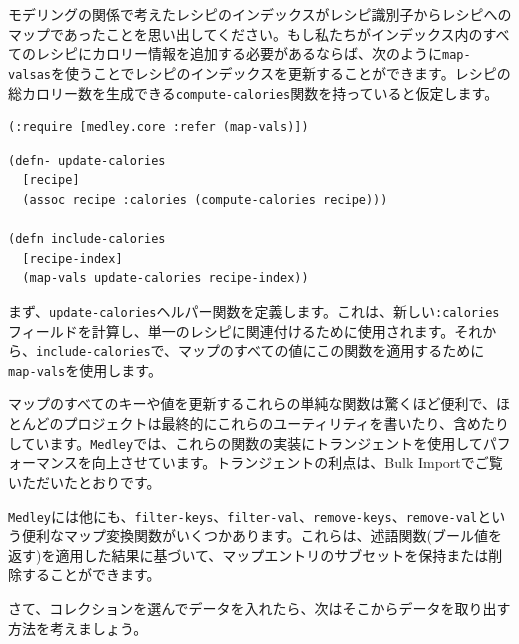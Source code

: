 モデリングの関係で考えたレシピのインデックスがレシピ識別子からレシピへのマップであったことを思い出してください。もし私たちがインデックス内のすべてのレシピにカロリー情報を追加する必要があるならば、次のように\texttt{map-valsas}を使うことでレシピのインデックスを更新することができます。レシピの総カロリー数を生成できる\texttt{compute-calories}関数を持っていると仮定します。

\begin{lstlisting}[numbers=none]
(:require [medley.core :refer (map-vals)])
\end{lstlisting}


\begin{lstlisting}[numbers=none]
(defn- update-calories
  [recipe]
  (assoc recipe :calories (compute-calories recipe)))

(defn include-calories
  [recipe-index]
  (map-vals update-calories recipe-index))
\end{lstlisting}

まず、\texttt{update-calories}ヘルパー関数を定義します。これは、新しい\texttt{:calories}フィールドを計算し、単一のレシピに関連付けるために使用されます。それから、\texttt{include-calories}で、マップのすべての値にこの関数を適用するために\texttt{map-vals}を使用します。
   
マップのすべてのキーや値を更新するこれらの単純な関数は驚くほど便利で、ほとんどのプロジェクトは最終的にこれらのユーティリティを書いたり、含めたりしています。\texttt{Medley}では、これらの関数の実装にトランジェントを使用してパフォーマンスを向上させています。トランジェントの利点は、Bulk Importでご覧いただいたとおりです。

\texttt{Medley}には他にも、\texttt{filter-keys}、\texttt{filter-val}、\texttt{remove-keys}、\texttt{remove-val}という便利なマップ変換関数がいくつかあります。これらは、述語関数(ブール値を返す)を適用した結果に基づいて、マップエントリのサブセットを保持または削除することができます。

さて、コレクションを選んでデータを入れたら、次はそこからデータを取り出す方法を考えましょう。

